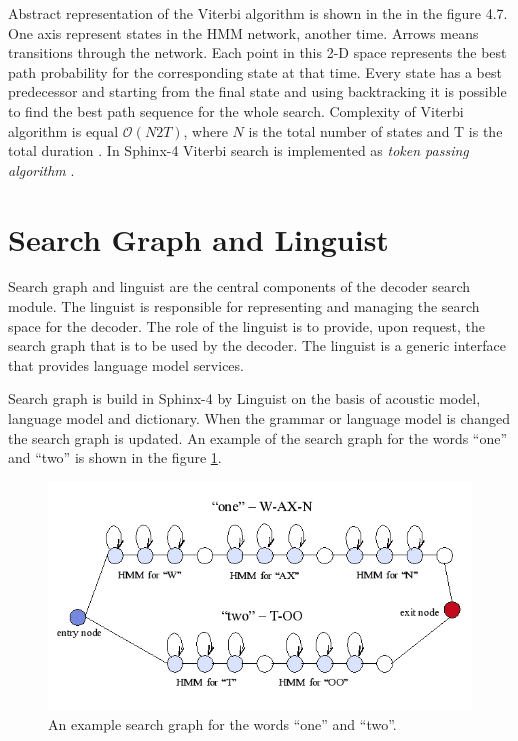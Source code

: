 Abstract representation of the Viterbi algorithm is shown in the in the figure 4.7. One axis represent states in the HMM network, another time.
 Arrows means transitions through the network. Each point in this 2-D space represents the best path probability for the corresponding state at that time. 
 Every state has a best predecessor and starting from the final state and using backtracking it is possible to find the best path sequence for the whole search.
Complexity of Viterbi algorithm is equal $\mathcal{O}(N2T)$, where $N$
is the total number of states and T is the total duration \parencite
{Ravishankar96efficientalgorithms}. In Sphinx-4 Viterbi search is implemented as
\textit {token passing algorithm} \parencite {Young89Token}. 

\section {Search Graph and Linguist} 

Search graph and linguist are the central components of the decoder search
module.  The linguist is responsible for representing and managing the search
space for the decoder. The role of the linguist is to provide, upon request, the search graph that is to be used by the decoder.
The linguist is a generic interface that provides language model services.

Search graph is build in Sphinx-4 by Linguist on the basis of acoustic
model, language model and dictionary. When the grammar or language model is changed the
search graph is updated.  An example of the search graph for the words ``one''
and ``two'' is shown in the figure \ref{fig:hmm}.

\begin{figure}[htbp]
  \centering
    \includegraphics[width=1.0\textwidth]{images/hmm.png}
 \caption{An example search graph for the words ``one'' and ``two''.}
  \label{fig:hmm}
\end {figure}

